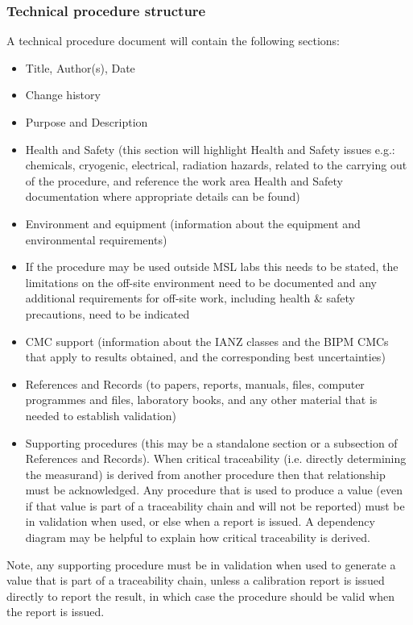\subsubsection{Technical procedure structure}
\label{sss:technical_procedure_structure}
A technical procedure document will contain the following sections:
\begin{itemize}
	\item Title, Author(s), Date
	\item Change history 
	\item Purpose and Description
	\item Health and Safety (this section will highlight Health and Safety issues e.g.: chemicals, cryogenic, electrical, radiation hazards, related to the carrying out of the procedure, and reference the work area Health and Safety documentation where appropriate details can be found)
	\item Environment and equipment (information about the equipment and environmental requirements)
	\item If the procedure may be used outside MSL labs this needs to be stated, the limitations on the off-site environment need to be documented and any additional requirements for off-site work, including health \& safety precautions, need to be indicated
	\item CMC support (information about the IANZ classes and the BIPM CMCs that apply to results obtained, and the corresponding best uncertainties)
	\item References and Records (to papers, reports, manuals, files, computer programmes and files, laboratory books, and any other material that is needed to establish validation)
	\item Supporting procedures (this may be a standalone section or a subsection of References and Records). When critical traceability (i.e. directly determining the measurand) is derived from another procedure then that relationship must be acknowledged. Any procedure that is used to produce a value (even if that value is part of a traceability chain and will not be reported) must be in validation when used, or else when a report is issued. A dependency diagram may be helpful to explain how critical traceability is derived.
	
\end{itemize}

Note, any supporting procedure must be in validation when used to generate a value that is part of a traceability chain, unless a calibration report is issued directly to report the result, in which case the procedure should be valid when the report is issued. 

